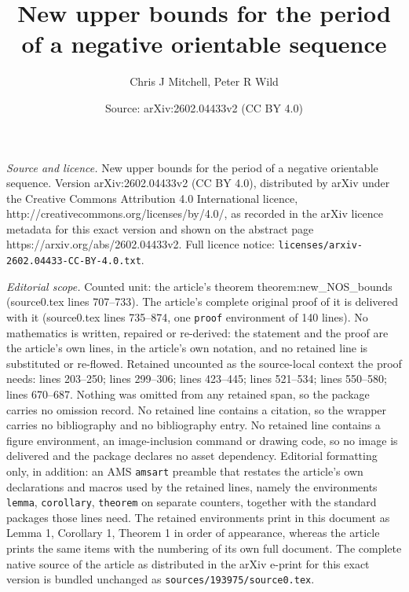 \documentclass[10pt,a4paper]{amsart}
\title{New upper bounds for the period of a negative orientable sequence}
\author{Chris J Mitchell, Peter R Wild}
\date{Source: arXiv:2602.04433v2 (CC BY 4.0)}
\begin{document}
\maketitle

\noindent\emph{Source and licence.} New upper bounds for the period of a negative orientable sequence. Version arXiv:2602.04433v2 (CC BY 4.0), distributed by arXiv under the Creative Commons Attribution 4.0 International licence, http://creativecommons.org/licenses/by/4.0/, as recorded in the arXiv licence metadata for this exact version and shown on the abstract page https://arxiv.org/abs/2602.04433v2. Full licence notice: \texttt{licenses/arxiv-2602.04433-CC-BY-4.0.txt}.\par\smallskip

\noindent\textit{Editorial scope.} Counted unit: the article's theorem theorem:new\_NOS\_bounds (source0.tex lines 707--733). The article's complete original proof of it is delivered with it (source0.tex lines 735--874, one \texttt{proof} environment of 140 lines). No mathematics is written, repaired or re-derived: the statement and the proof are the article's own lines, in the article's own notation, and no retained line is substituted or re-flowed.  Retained uncounted as the source-local context the proof needs: lines 203--250; lines 299--306; lines 423--445; lines 521--534; lines 550--580; lines 670--687.  Nothing was omitted from any retained span, so the package carries no omission record.  No retained line contains a citation, so the wrapper carries no bibliography and no bibliography entry.  No retained line contains a figure environment, an image-inclusion command or drawing code, so no image is delivered and the package declares no asset dependency.  Editorial formatting only, in addition: an AMS \texttt{amsart} preamble that restates the article's own declarations and macros used by the retained lines, namely the environments \texttt{lemma}, \texttt{corollary}, \texttt{theorem} on separate counters, together with the standard packages those lines need.  The retained environments print in this document as Lemma 1, Corollary 1, Theorem 1 in order of appearance, whereas the article prints the same items with the numbering of its own full document.  The complete native source of the article as distributed in the arXiv e-print for this exact version is bundled unchanged as \texttt{sources/193975/source0.tex}.
\end{document}
